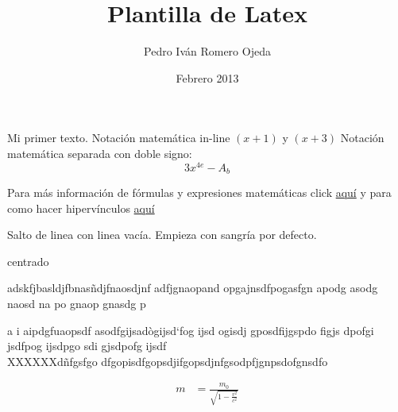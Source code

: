 \documentclass[12pt]{article}
\title{Plantilla de Latex}
\author{Pedro Iván Romero Ojeda}
\date{Febrero 2013}
\begin{document}
\maketitle
Mi primer texto. Notación matemática in-line $(x+1)$ y $(x+3)$ Notación matemática separada con doble signo: $$3x^{4e} - A_b$$

Para más información de fórmulas y expresiones matemáticas click \href{http://en.wikibooks.org/wiki/LaTeX/Mathematics}{aquí} y para como hacer hipervínculos \href{http://en.wikibooks.org/wiki/LaTeX/Hyperlinks}{aquí}

Salto de linea con linea vacía. Empieza con sangría por defecto.
\begin{center}
centrado %
\end{center}


adskfjbasldjfbnasñdjfnaosdjnf adfjgnaopand opgajnsdfpogasfgn apodg asodg naosd na po gnaop gnasdg p

a i aipdgfuaopsdf asodfgijsadògijsd`fog ijsd ogisdj gposdfijgspdo figjs dpofgi jsdfpog ijsdpgo sdi gjsdpofg ijsdf\\
XXXXXXdñfgsfgo dfgopisdfgopsdjifgopsdjnfgsodpfjgnpsdofgnsdfo



\begin{align}
m &= \frac{m_0}{\sqrt{1-\frac{v^2}{c^2}}}
\end{align}
\end{document}
